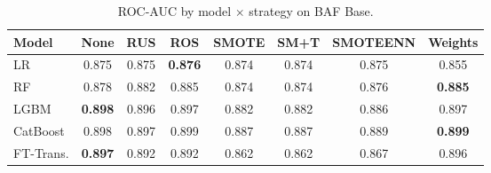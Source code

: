 \begin{table}[ht!]
\centering
\caption{ROC-AUC by model $\times$ strategy on BAF Base.}
\label{tab:factorial_baf_rocauc}
\begin{tabular}{l c c c c c c c}
\toprule
Model & None & RUS & ROS & SMOTE & SM+T & SMOTEENN & Weights \\
\midrule
LR         & 0.875 & 0.875 & \textbf{0.876} & 0.874 & 0.874 & 0.875 & 0.855 \\
RF         & 0.878 & 0.882 & 0.885 & 0.874 & 0.874 & 0.876 & \textbf{0.885} \\
LGBM       & \textbf{0.898} & 0.896 & 0.897 & 0.882 & 0.882 & 0.886 & 0.897 \\
CatBoost   & 0.898 & 0.897 & 0.899 & 0.887 & 0.887 & 0.889 & \textbf{0.899} \\
FT-Trans.  & \textbf{0.897} & 0.892 & 0.892 & 0.862 & 0.862 & 0.867 & 0.896 \\
\bottomrule
\end{tabular}
\end{table}